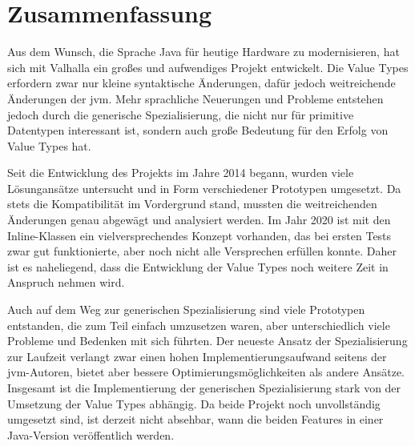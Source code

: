 \section{Zusammenfassung}\label{sec:summary}

Aus dem Wunsch, die Sprache Java für heutige Hardware zu modernisieren, hat sich mit Valhalla ein großes und aufwendiges Projekt entwickelt.
Die Value Types erfordern zwar nur kleine syntaktische Änderungen, dafür jedoch weitreichende Änderungen der \ac{jvm}.
Mehr sprachliche Neuerungen und Probleme entstehen jedoch durch die generische Spezialisierung, die nicht nur für primitive Datentypen interessant ist, sondern auch große Bedeutung für den Erfolg von Value Types hat.

Seit die Entwicklung des Projekts im Jahre 2014 begann, wurden viele Lösungansätze untersucht und in Form verschiedener Prototypen umgesetzt.
Da stets die Kompatibilität im Vordergrund stand, mussten die weitreichenden Änderungen genau abgewägt und analysiert werden.
Im Jahr 2020 ist mit den Inline-Klassen ein vielversprechendes Konzept vorhanden, das bei ersten Tests zwar gut funktionierte, aber noch nicht alle Versprechen erfüllen konnte.
Daher ist es naheliegend, dass die Entwicklung der Value Types noch weitere Zeit in Anspruch nehmen wird.

Auch auf dem Weg zur generischen Spezialisierung sind viele Prototypen entstanden, die zum Teil einfach umzusetzen waren, aber unterschiedlich viele Probleme und Bedenken mit sich führten.
Der neueste Ansatz der Spezialisierung zur Laufzeit verlangt zwar einen hohen Implementierungsaufwand seitens der \ac{jvm}-Autoren, bietet aber bessere Optimierungsmöglichkeiten als andere Ansätze.
Insgesamt ist die Implementierung der generischen Spezialisierung stark von der Umsetzung der Value Types abhängig.
Da beide Projekt noch unvollständig umgesetzt sind, ist derzeit nicht absehbar, wann die beiden Features in einer Java-Version veröffentlich werden.
